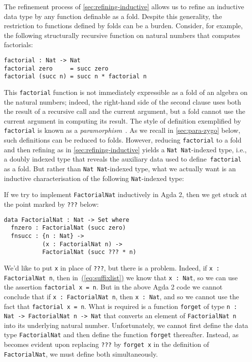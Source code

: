 \documentclass{LMCS}
\newcommand{\parenref}[1]{\hyperref[#1]{(\ref*{#1})}}
\begin{document}
The refinement process of \autoref{sec:refining-inductive} allows us
to refine an inductive data type by any function definable as a fold.
Despite this generality, the restriction to functions defined by folds
can be a burden. Consider, for example, the following structurally
recursive function on natural numbers that computes factorials:
\begin{verbatim}
factorial : Nat -> Nat
factorial zero     = succ zero
factorial (succ n) = succ n * factorial n
\end{verbatim}
This \verb|factorial| function is not immediately expressible as a
fold of an algebra on the natural numbers; indeed, the right-hand side
of the second clause uses both the result of a recursive call and the
current argument, but a fold cannot use the current argument in
computing its result. The style of definition exemplified by
\verb|factorial| is known as a
\emph{paramorphism}~\cite{meertens92paramorphism}. As we recall in
\autoref{sec:para-zygo} below, such definitions can be reduced to
folds. However, reducing \verb|factorial| to a fold and then refining
as in \autoref{sec:refining-inductive} yields a \texttt{Nat
   Nat}-indexed type, i.e., a doubly indexed type that
reveals the auxiliary data used to define~\texttt{factorial} as a
fold.  But rather than \texttt{Nat  Nat}-indexed type,
what we actually want is an inductive characterisation of the
following \texttt{Nat}-indexed type:

If we try to implement \texttt{FactorialNat} inductively in Agda 2,
then we get stuck at the point marked by \texttt{???} below:
\begin{verbatim}
data FactorialNat : Nat -> Set where
  fnzero : FactorialNat (succ zero)
  fnsucc : {n : Nat} ->
           (x : FactorialNat n) ->
           FactorialNat (succ ??? * n)
\end{verbatim}
We'd like to put \verb|x| in place of \verb|???|, but there is a
problem. Indeed, if \verb|x : FactorialNat n|, then
in~\parenref{eq:suffixlist} we know that \verb|x : Nat|, so we can use
the assertion \verb|factorial x = n|.  But in the above Agda 2 code we
cannot conclude that if \verb|x : FactorialNat n|, then 
\verb|x : Nat|, and so we cannot use the fact that 
\verb|factorial x = n|. What is required is a function
{\tt forget} of type {\tt {n : Nat} -> FactorialNat n -> Nat} that
converts an element of \verb|FactorialNat n| into its underlying
natural number. Unfortunately, we cannot first define the data type
\verb|FactorialNat| and then define the function \verb|forget|
thereafter. Instead, as becomes evident upon replacing \verb|???| by
\verb|forget x| in the definition of \verb|FactorialNat|, we must
define both simultaneously.
\end{document}
